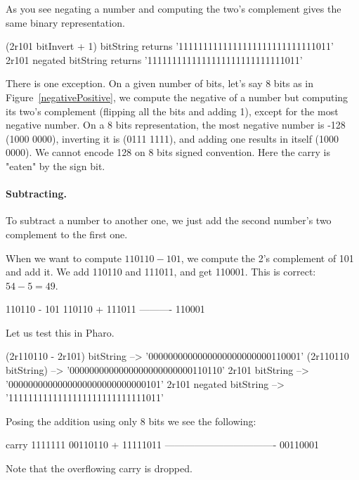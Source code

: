 \documentclass[a4paper,10pt,twoside]{book}
\begin{document}
As you see negating a number and computing the two's complement gives the same binary representation.
\begin{code}{}
(2r101 bitInvert + 1) bitString
	returns '1111111111111111111111111111011'	
2r101 negated bitString
	returns '1111111111111111111111111111011'	
\end{code}

There is one exception. On a given number of bits, let's say 8 bits as in Figure~\ref{negativePositive},
we compute the negative of a number but computing its two's complement (flipping all the bits and adding 1), except for the most negative number. On a 8 bits representation, the most negative number is -128 (1000 0000), inverting it is (0111 1111), and adding one results in itself (1000 0000). We cannot encode 128 on 8 bits signed convention. Here the carry is "eaten" by the sign bit. 

\paragraph{Subtracting.}
To subtract a number to another one, we just add the second number's two complement to the first one.

When we want to compute $110110 - 101$, we  compute the 2's complement of 101 and add it. 
We add 110110 and 111011, and get 110001. This is correct: $54 - 5 = 49$.


\begin{code}{}
110110 - 101
   110110
+ 111011
----------
   110001
\end{code}

Let us test this in Pharo.
\begin{code}{}
(2r110110 - 2r101) bitString	
	--> '0000000000000000000000000110001'
(2r110110 bitString) 	
	--> '0000000000000000000000000110110'
2r101 bitString
	--> '0000000000000000000000000000101'		
2r101 negated bitString
	--> '1111111111111111111111111111011'	
\end{code}
	
Posing the addition using only 8 bits we see the following:

\begin{code}{}
carry	1111111 
		 00110110
+		11111011	
	----------------------------------
		 00110001	
\end{code}

Note that the overflowing carry is dropped.
\end{document}
